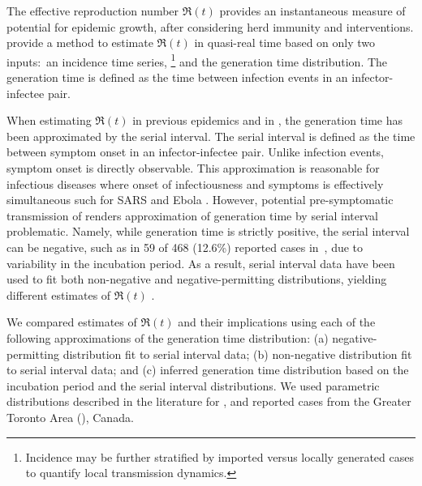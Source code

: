 The effective reproduction number $\Re(t)$ provides
an instantaneous measure of potential for epidemic growth,
after considering herd immunity and interventions.
\textcite{Cori2013} provide a method to estimate $\Re(t)$
in quasi-real time based on only two inputs:\
an incidence time series,%
\footnote{Incidence may be further stratified by
  imported versus locally generated cases
  to quantify local transmission dynamics.}
and the generation time distribution.
The generation time is defined as
the time between infection events in an infector-infectee pair.
\par
When estimating $\Re(t)$
in previous epidemics \cite{Cori2013,Ali2013,Aylward2014}
and in \covid \cite{Pan2020,Cowling2020,Leung2020,Liu2020},
the generation time has been approximated by the serial interval.
The serial interval is defined as
the time between symptom onset in an infector-infectee pair.
Unlike infection events, symptom onset is directly observable.
This approximation is reasonable for infectious diseases
where onset of infectiousness and symptoms
is effectively simultaneous \cite{Cori2013}
such for SARS and Ebola \cite{Zeng2009,Osterholm2015}.
However, potential pre-symptomatic transmission of \covid
\cite{Kimball2020,Du2020}
renders approximation of generation time by serial interval problematic.
Namely, while generation time is strictly positive,
the serial interval can be negative,
such as in 59 of 468 (12.6\%) reported cases in~\cite{Du2020},
due to variability in the incubation period.
As a result, \covid serial interval data have been used to fit both
non-negative and negative-permitting distributions,
yielding different estimates of $\Re(t)$
\cite{Du2020,Zhang2020,Ganyani2020}.
\par
We compared estimates of $\Re(t)$ and their implications using
each of the following approximations of the generation time distribution:
(a) negative-permitting distribution fit to serial interval data;
(b) non-negative distribution fit to serial interval data; and
(c) inferred generation time distribution based on
the incubation period and the serial interval distributions.
We used parametric distributions described in the literature for \covid,
and reported cases from the Greater Toronto Area (\gta), Canada.